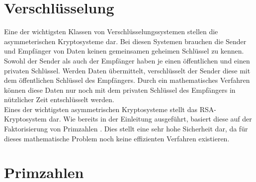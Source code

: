 \documentclass[12pt,a4paper]{article}
\begin{document}
\section{Verschlüsselung}
Eine der wichtigsten Klassen von Verschlüsselungssystemen stellen die asymmeterischen Kryptosysteme dar. Bei diesen Systemen brauchen die Sender und Empfänger von Daten keinen gemeinsamen geheimen Schlüssel zu kennen. Sowohl der Sender als auch der Empfänger haben je einen öffentlichen und einen privaten Schlüssel. Werden Daten übermittelt, verschlüsselt der Sender diese mit dem öffentlichen Schlüssel des Empfängers. Durch ein mathematisches Verfahren können diese Daten nur noch mit dem privaten Schlüssel des Empfängers in nützlicher Zeit entschlüsselt werden.\\
Eines der wichtigsten asymmetrischen Kryptosysteme stellt das RSA-Kryptosystem dar. Wie bereits in der Einleitung ausgeführt, basiert diese auf der Faktorisierung von Primzahlen \cite{Beutelspacher.2010}. Dies stellt eine sehr hohe Sicherheit dar, da für dieses mathematische Problem noch keine effizienten Verfahren existieren.
\section{Primzahlen}
\end{document}
